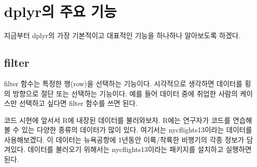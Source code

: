 \documentclass[
]{book}
\theoremstyle{definition}
\theoremstyle{definition}
\theoremstyle{definition}
\theoremstyle{definition}
\theoremstyle{remark}
\begin{document}
\hypertarget{dplyruxc758-uxc8fcuxc694-uxae30uxb2a5}{%
\section{dplyr의 주요 기능}\label{dplyruxc758-uxc8fcuxc694-uxae30uxb2a5}}

지금부터 dplyr의 가장 기본적이고 대표적인 기능을 하나하나 알아보도록 하겠다.

\hypertarget{filter}{%
\subsection{filter}\label{filter}}

filter 함수는 특정한 행(row)을 선택하는 기능이다. 시각적으로 생각하면 데이터를 횡의 방향으로 절단 또는 선택하는 기능이다. 예를 들어 데이터 중에 취업한 사람의 케이스만 선택하고 싶다면 filter 함수를 쓰면 된다.

코드 시현에 앞서서 R에 내장된 데이터를 불러와보자. R에는 연구자가 코드를 연습해볼 수 있는 다양한 종류의 데이터가 많이 있다. 여기서는 nycflights13이라는 데이터를 사용해보겠다. 이 데이터는 뉴욕공항에 1년동안 이륙/착륙한 비행기의 각종 정보가 담겨있다. 데이터를 불러오기 위해서는 nycflights13이라는 패키지를 설치하고 실행하면 된다.
\end{document}
